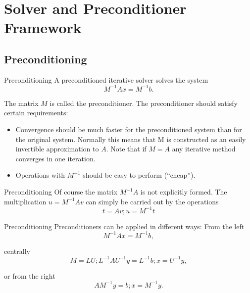 \section{Solver and Preconditioner Framework}

\subsection{Preconditioning}
\begin{frame}{Preconditioning}
  A preconditioned iterative solver solves the system
  \begin{equation}
    M^{-1} A x = M^{-1}b .
  \end{equation}

The matrix $M$ is called the preconditioner.
The preconditioner should satisfy certain requirements:
\begin{itemize}
\item Convergence should be much faster for the preconditioned
system than for the original system. Normally this means
that M is constructed as an easily invertible approximation
to $A$. Note that if $M = A$ any iterative method converges in
one iteration.
\item Operations with $M^{-1}$ should be easy to perform (``cheap'').

\end{itemize}
\end{frame}

\begin{frame}{Preconditioning}
  Of course the matrix $M^{-1}A$ is not explicitly formed. The
multiplication $u = M^{-1}Av$ can simply be carried out by the
operations
\begin{equation*}
t = Av; u = M^{-1}t
\end{equation*}

\end{frame}

\begin{frame}{Preconditioning}
  Preconditioners can be applied in different ways:
  From the left
  \begin{equation*}
    M^{-1}Ax = M^{-1}b ,
  \end{equation*}

  centrally
  \begin{equation*}
M = LU; L^{-1}AU^{-1}y = L^{-1}b; x = U^{-1}y ,
  \end{equation*}

  or from the right
  \begin{equation*}
    AM^{-1}y = b; x = M^{-1}y .
  \end{equation*}

\end{frame}

